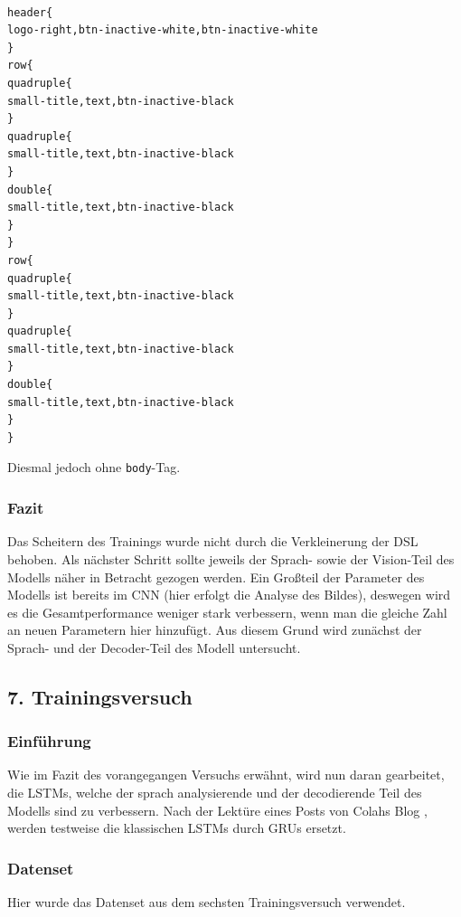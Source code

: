 \documentclass[pdftex,a4paper,halfparskip, article]{scrartcl}
\begin{document}
\begin{verbatim}

header{
logo-right,btn-inactive-white,btn-inactive-white
}
row{
quadruple{
small-title,text,btn-inactive-black
}
quadruple{
small-title,text,btn-inactive-black
}
double{
small-title,text,btn-inactive-black
}
}
row{
quadruple{
small-title,text,btn-inactive-black
}
quadruple{
small-title,text,btn-inactive-black
}
double{
small-title,text,btn-inactive-black
}
}

\end{verbatim}

Diesmal jedoch ohne \texttt{body}-Tag.


\subsubsection*{Fazit}

Das Scheitern des Trainings wurde nicht durch die Verkleinerung der DSL behoben. Als nächster Schritt sollte jeweils der Sprach- sowie der Vision-Teil des Modells näher in Betracht gezogen werden. Ein Großteil der Parameter des Modells ist bereits im CNN (hier erfolgt die Analyse des Bildes), deswegen wird es die Gesamtperformance weniger stark verbessern, wenn man die gleiche Zahl an neuen Parametern hier hinzufügt. Aus diesem Grund wird zunächst der Sprach- und der Decoder-Teil des Modell untersucht.

\subsection{7. Trainingsversuch}


\subsubsection*{Einführung}

Wie im Fazit des vorangegangen Versuchs erwähnt, wird nun daran gearbeitet, die LSTMs, welche der sprach analysierende und der decodierende Teil des Modells sind zu verbessern. Nach der Lektüre eines Posts von Colahs Blog \cite{colahsBlogLSTM}, werden testweise die klassischen LSTMs durch GRUs ersetzt.

\subsubsection*{Datenset}

Hier wurde das Datenset aus dem sechsten Trainingsversuch verwendet.
\end{document}
